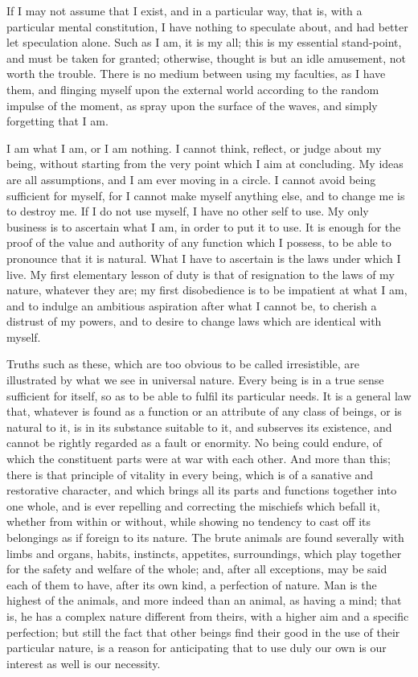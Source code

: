 If I may not assume that I exist, and in a particular way, that is,
with a particular mental constitution, I have nothing to speculate
about, and had better let speculation alone. Such as I am, it is my
all; this is my essential stand-point, and must be taken for granted;
otherwise, thought is but an idle amusement, not worth the trouble.
There is no medium between using my faculties, as I have them, and
flinging myself upon the external world according to the random
impulse of the moment, as spray upon the surface of the waves, and
simply forgetting that I am.

I am what I am, or I am nothing. I cannot think, reflect, or judge
about my being, without starting from the very point which I aim at
concluding. My ideas are all assumptions, and I am ever moving in a
circle. I cannot avoid being sufficient for myself, for I cannot make
myself anything else, and to change me is to destroy me. If I do not
use myself, I have no other self to use. My only business is to
ascertain what I am, in order to put it to use. It is enough for the
proof of the value and authority of any function which I possess, to
be able to pronounce that it is natural. What I have to ascertain is
the laws under which I live. My first elementary lesson of duty is
that of resignation to the laws of my nature, whatever they are; my
first disobedience is to be impatient at what I am, and to indulge an
ambitious aspiration after what I cannot be, to cherish a distrust of
my powers, and to desire to change laws which are identical with
myself.

Truths such as these, which are too obvious to be called
irresistible, are illustrated by what we see in universal nature.
Every being is in a true sense sufficient for itself, so as to be able
to fulfil its particular needs. It is a general law that, whatever is
found as a function or an attribute of any class of beings, or is
natural to it, is in its substance suitable to it, and subserves its
existence, and cannot be rightly regarded as a fault or enormity. No
being could endure, of which the constituent parts were at war with
each other. And more than this; there is that principle of vitality in
every being, which is of a sanative and restorative character, and
which brings all its parts and functions together into one whole, and
is ever repelling and correcting the mischiefs which befall it,
whether from within or without, while showing no tendency to cast off
its belongings as if foreign to its nature. The brute animals are
found severally with limbs and organs, habits, instincts, appetites,
surroundings, which play together for the safety and welfare of the
whole; and, after all exceptions, may be said each of them to have,
after its own kind, a perfection of nature. Man is the highest of the
animals, and more indeed than an animal, as having a mind; that is, he
has a complex nature different from theirs, with a higher aim and a
specific perfection; but still the fact that other beings find their
good in the use of their particular nature, is a reason for
anticipating that to use duly our own is our interest as well is our
necessity.

